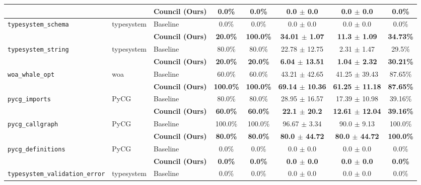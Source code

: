 \begin{table}[t]
\begin{tabular}{lll c c c c c}
 & & \textbf{Council (Ours)} & \textbf{0.0\%} & \textbf{0.0\%} & \textbf{0.0 $\pm$ 0.0} & \textbf{0.0 $\pm$ 0.0} & \textbf{0.0\%} \\
\midrule
\multirow{2}{*}{\texttt{typesystem\_schema}} & \multirow{2}{*}{typesystem} & Baseline & 0.0\% & 0.0\% & 0.0 $\pm$ 0.0 & 0.0 $\pm$ 0.0 & 0.0\% \\
 & & \textbf{Council (Ours)} & \textbf{20.0\%} & \textbf{100.0\%} & \textbf{34.01 $\pm$ 1.07} & \textbf{11.3 $\pm$ 1.09} & \textbf{34.73\%} \\
\midrule
\multirow{2}{*}{\texttt{typesystem\_string}} & \multirow{2}{*}{typesystem} & Baseline & 80.0\% & 80.0\% & 22.78 $\pm$ 12.75 & 2.31 $\pm$ 1.47 & 29.5\% \\
 & & \textbf{Council (Ours)} & \textbf{20.0\%} & \textbf{20.0\%} & \textbf{6.04 $\pm$ 13.51} & \textbf{1.04 $\pm$ 2.32} & \textbf{30.21\%} \\
\midrule
\multirow{2}{*}{\texttt{woa\_whale\_opt}} & \multirow{2}{*}{woa} & Baseline & 60.0\% & 60.0\% & 43.21 $\pm$ 42.65 & 41.25 $\pm$ 39.43 & 87.65\% \\
 & & \textbf{Council (Ours)} & \textbf{100.0\%} & \textbf{100.0\%} & \textbf{69.14 $\pm$ 10.36} & \textbf{61.25 $\pm$ 11.18} & \textbf{87.65\%} \\
\midrule
\multirow{2}{*}{\texttt{pycg\_imports}} & \multirow{2}{*}{PyCG} & Baseline & 80.0\% & 80.0\% & 28.95 $\pm$ 16.57 & 17.39 $\pm$ 10.98 & 39.16\% \\
 & & \textbf{Council (Ours)} & \textbf{60.0\%} & \textbf{60.0\%} & \textbf{22.1 $\pm$ 20.2} & \textbf{12.61 $\pm$ 12.04} & \textbf{39.16\%} \\
\midrule
\multirow{2}{*}{\texttt{pycg\_callgraph}} & \multirow{2}{*}{PyCG} & Baseline & 100.0\% & 100.0\% & 96.67 $\pm$ 3.34 & 90.0 $\pm$ 9.13 & 100.0\% \\
 & & \textbf{Council (Ours)} & \textbf{80.0\%} & \textbf{80.0\%} & \textbf{80.0 $\pm$ 44.72} & \textbf{80.0 $\pm$ 44.72} & \textbf{100.0\%} \\
\midrule
\multirow{2}{*}{\texttt{pycg\_definitions}} & \multirow{2}{*}{PyCG} & Baseline & 0.0\% & 0.0\% & 0.0 $\pm$ 0.0 & 0.0 $\pm$ 0.0 & 0.0\% \\
 & & \textbf{Council (Ours)} & \textbf{0.0\%} & \textbf{0.0\%} & \textbf{0.0 $\pm$ 0.0} & \textbf{0.0 $\pm$ 0.0} & \textbf{0.0\%} \\
\midrule
\multirow{2}{*}{\texttt{typesystem\_validation\_error}} & \multirow{2}{*}{typesystem} & Baseline & 0.0\% & 0.0\% & 0.0 $\pm$ 0.0 & 0.0 $\pm$ 0.0 & 0.0\% \\

\end{tabular}
\end{table}
